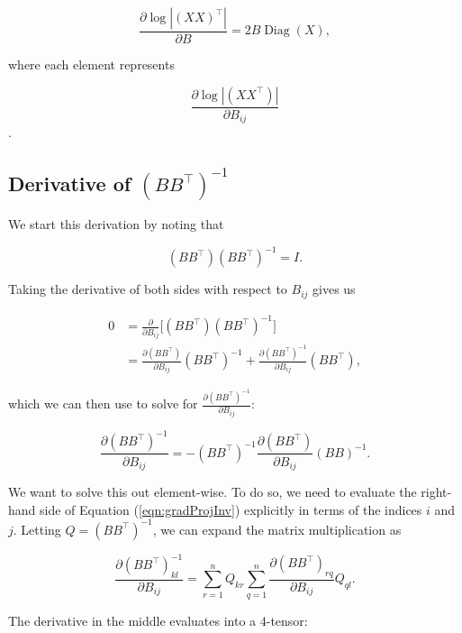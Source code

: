 \documentclass{article}
\theoremstyle{definition}
\DeclareMathOperator{\Diag}{Diag}
\begin{document}
\begin{equation}
    \label{eqn:gradLogDetMatrix}
    \frac{\partial \log |(XX)^\top|}{\partial B} = 2B \Diag(X),
\end{equation}

where each element represents 

\[\frac{\partial \log |(XX^\top)|}{\partial B_{ij}}\].

\subsection{Derivative of $(BB^\top)^{-1}$}
\label{subsec:gradProjInvDerivation}

We start this derivation by noting that

\[
(BB^\top)(BB^\top)^{-1} = I.
\]

Taking the derivative of both sides with respect to $B_{ij}$ gives us

\[
\begin{split}
    0 & = \frac{\partial}{\partial B_{ij}} \big[(BB^\top)(BB^\top)^{-1} \big] \\ 
    & = \frac{\partial (BB^\top)}{\partial B_{ij}} (BB^\top)^{-1} + \frac{\partial (BB^\top)^{-1}}{\partial B_{ij}} (BB^\top),
\end{split}
\]

which we can then use to solve for $\frac{\partial (BB^\top)^{-1}}{\partial B_{ij}}$:

\begin{equation}
    \label{eqn:gradProjInv}
    \frac{\partial (BB^\top)^{-1}}{\partial B_{ij}} = -(BB^\top)^{-1} \frac{\partial (BB^\top)}{\partial B_{ij}} (BB)^{-1}.
\end{equation}

We want to solve this out element-wise. To do so, we need to evaluate the right-hand side of Equation (\ref{eqn:gradProjInv}) explicitly in terms of the indices $i$ and $j$. Letting $Q = (BB^\top)^{-1}$, we can expand the matrix multiplication as

\begin{equation}
    \label{eqn:gradProjInvHighLevel}
    \frac{\partial (BB^\top)^{-1}_{kl}}{\partial B_{ij}} = \sum_{r=1}^{n} Q_{kr} \sum_{q=1}^{n} \frac{\partial (BB^\top)_{rq}}{\partial B_{ij}} Q_{ql}.
\end{equation}

The derivative in the middle evaluates into a $4$-tensor:
\end{document}
